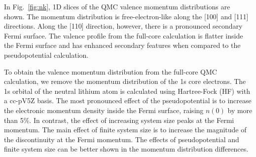 \documentclass[aps,prb,showpacs,preprintnumbers,amsmath,amssymb,superscriptaddress,twocolumn]{revtex4-1}
\begin{document}
In Fig.~\ref{fig:nk}, 1D slices of the QMC valence momentum distributions are shown. The momentum distribution is free-electron-like along the [100] and [111] directions. Along the [110] direction, however, there is a pronounced secondary Fermi surface. The valence profile from the full-core calculation is flatter inside the Fermi surface and has enhanced secondary features when compared to the pseudopotential calculation. 

To obtain the valence momentum distribution from the full-core QMC calculation, we remove the momentum distribution of the 1s core electrons. The 1s orbital of the neutral lithium atom is calculated using Hartree-Fock (HF) with a cc-pV5Z basis. The most pronounced effect of the pseudopotential is to increase the electronic momentum density inside the Fermi surface, raising $n(0)$ by more than 5\%. In contrast, the effect of increasing system size peaks at the Fermi momentum. The main effect of finite system size is to increase the magnitude of the discontinuity at the Fermi momentum. The effects of pseudopotential and finite system size can be better shown in the momentum distribution differences.
\end{document}
